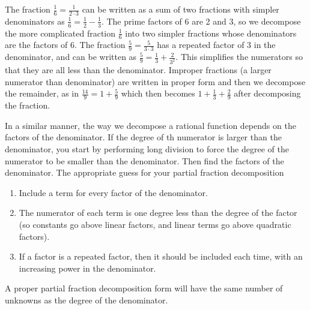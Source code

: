  The fraction $\frac{1}{6} = \frac{1}{2\cdot 3}$ can be written as a sum of two fractions with simpler denominators as $\frac16=\frac12-\frac13$. The prime factors of 6 are 2 and 3, so we decompose the more complicated fraction $\frac16$ into two simpler fractions whose denominators are the factors of 6. The fraction $\frac{5}{9} = \frac{5}{3\cdot 3}$ has a repeated factor of $3$ in the denominator, and can be written as $\frac{5}{9} = \frac{1}{3}+\frac{2}{3^2}$. This simplifies the numerators so that they are all less than the denominator. Improper fractions (a larger numerator than denominator) are written in proper form and then we decompose the remainder, as in $\frac{14}{9}=1+\frac59$ which then becomes $1+\frac13+\frac29$ after decomposing the fraction.
 
In a similar manner, the way we decompose a rational function depends on the factors of the denominator.  If the degree of th numerator is larger than the denominator, you start by performing long division to force the degree of the numerator to be smaller than the denominator.  Then find the factors of the denominator.  The appropriate guess for your partial fraction decomposition 
\begin{enumerate}
	\item Include a term for every factor of the denominator.
	\item The numerator of each term is one degree less than the degree of the factor (so constants go above linear factors, and linear terms go above quadratic factors).
	\item If a factor is a repeated factor, then it should be included each time, with an increasing power in the denominator.
\end{enumerate}
A proper partial fraction decomposition form will have the same number of unknowns as the degree of the denominator.
 
